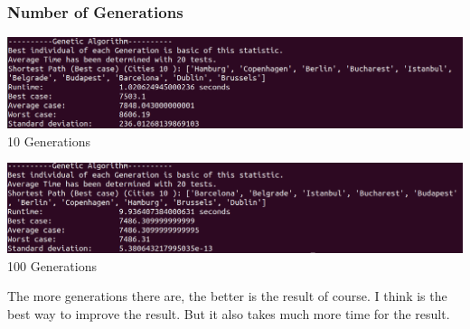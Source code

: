 \documentclass[10pt,a4paper]{article}
\begin{document}
	\subsubsection{Number of Generations}
	\begin{center}
		\includegraphics[width=1\linewidth]{pictures/geneticAlgorithm/10gen}
		\\
		10 Generations
		\\
	\end{center}
	\begin{center}
		\includegraphics[width=1\linewidth]{pictures/geneticAlgorithm/100gen}
		\\
		100 Generations
		\\
	\end{center}
	The more generations there are, the better is the result of course. I think is the best way to improve the result. But it also takes much more time for the result.
	
	
\end{document}
